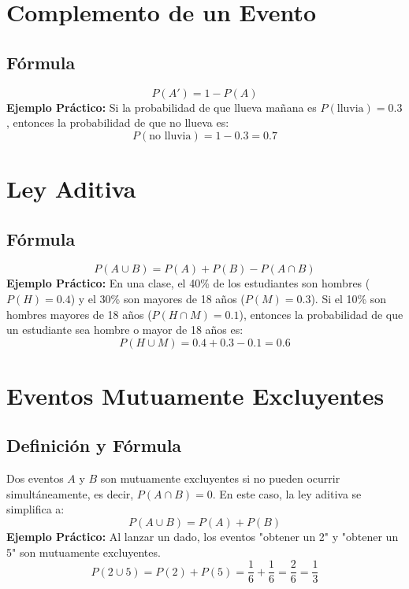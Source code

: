 \documentclass[10pt]{article}
\begin{document}
	\vspace{1cm}
	
	\begin{multicols}{2}
		\section*{Complemento de un Evento}
		
		\subsection*{Fórmula}
		\[
		P(A') = 1 - P(A)
		\]
		\textbf{Ejemplo Práctico:}  
		Si la probabilidad de que llueva mañana es \( P(\text{lluvia}) = 0.3 \), entonces la probabilidad de que no llueva es:
		\[
		P(\text{no lluvia}) = 1 - 0.3 = 0.7
		\]
		
		\section*{Ley Aditiva}
		
		\subsection*{Fórmula}
		\[
		P(A \cup B) = P(A) + P(B) - P(A \cap B)
		\]
		\textbf{Ejemplo Práctico:}  
		En una clase, el 40\% de los estudiantes son hombres (\( P(H) = 0.4 \)) y el 30\% son mayores de 18 años (\( P(M) = 0.3 \)). Si el 10\% son hombres mayores de 18 años (\( P(H \cap M) = 0.1 \)), entonces la probabilidad de que un estudiante sea hombre o mayor de 18 años es:
		\[
		P(H \cup M) = 0.4 + 0.3 - 0.1 = 0.6
		\]
		
		\section*{Eventos Mutuamente Excluyentes}
		
		\subsection*{Definición y Fórmula}
		Dos eventos \( A \) y \( B \) son mutuamente excluyentes si no pueden ocurrir simultáneamente, es decir, \( P(A \cap B) = 0 \).  
		En este caso, la ley aditiva se simplifica a:
		\[
		P(A \cup B) = P(A) + P(B)
		\]
		\textbf{Ejemplo Práctico:}  
		Al lanzar un dado, los eventos "obtener un 2" y "obtener un 5" son mutuamente excluyentes.  
		\[
		P(2 \cup 5) = P(2) + P(5) = \frac{1}{6} + \frac{1}{6} = \frac{2}{6} = \frac{1}{3}
		\]
		

\end{multicols}
\end{document}
